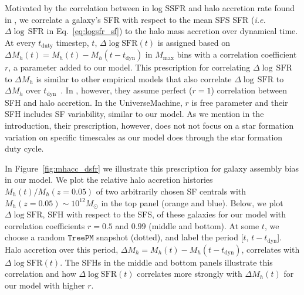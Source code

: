 \documentclass[12pt, letterpaper, preprint, tighten]{aastex62}
\newcommand{\logsfr}{\log\mathrm{SFR}}
\begin{document}
Motivated by the correlation between in log SSFR and halo accretion rate found 
in \cite{tinker2018}, we correlate a galaxy's SFR with respect to the mean SFS 
SFR (\emph{i.e.} $\Delta\log\,\mathrm{SFR}$ in Eq.~\ref{eq:logsfr_sf}) to the 
halo mass accretion over dynamical time. At every $t_\mathrm{duty}$ timestep, 
$t$, $\Delta\logsfr(t)$ is assigned based on 
$\Delta M_h(t) = M_h(t) - M_h(t - t_\mathrm{dyn})$ in $M_\mathrm{max}$ bins 
with a correlation coefficient $r$, a parameter added to our model. This 
prescription for correlating $\Delta\log\,\mathrm{SFR}$ to $\Delta M_h$ is 
similar to other empirical models that also correlate $\Delta\log\,\mathrm{SFR}$ 
to $\Delta M_h$ over $t_\mathrm{dyn}$~\citep{rodriguez-puebla2016a, behroozi2018}.
In \cite{rodriguez-puebla2016a}, however, they assume perfect ($r=1$) correlation 
between SFH and halo accretion. In the \cite{behroozi2018} {\sc UniverseMachine}, 
$r$ is free parameter and their SFH includes SF variability, similar to our model. 
As we mention in the introduction, their prescription, however, does not not focus 
on a star formation variation on specific timescales as our model does through 
the star formation duty cycle. 

In Figure~\ref{fig:mhacc_dsfr} we illustrate this prescription for galaxy
assembly bias in our model. We plot the relative halo accretion histories 
$M_h(t)/M_h(z{=}0.05)$ of two arbitrarily chosen SF centrals with 
$M_h(z{=}0.05)\sim10^{12}M_\odot$ in the top panel (orange and blue). Below, we plot 
$\Delta\logsfr$, SFH with respect to the SFS, of these galaxies for our model with 
correlation coefficients $r=0.5$ and $0.99$ (middle and bottom). At some $t$, we 
choose a random $\mathtt{TreePM}$ snapshot (dotted), and label the period 
[$t$, $t - t_\mathrm{dyn}$]. Halo accretion over this period, 
$\Delta M_h = M_h(t) - M_h(t-t_\mathrm{dyn})$, correlates with $\Delta\logsfr(t)$. 
The SFHs in the middle and bottom panels illustrate this correlation and how 
$\Delta\logsfr(t)$ correlates more strongly with $\Delta M_h(t)$ for our model 
with higher $r$. 
\end{document}
